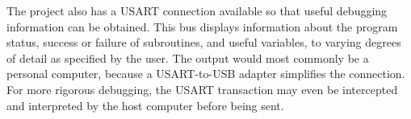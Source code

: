 The project also has a USART connection available so that useful debugging information can be obtained\DIFdelbegin {}\DIFdelend . This bus displays information about the program status, success or failure of subroutines, and useful variables, to varying degrees of detail as specified by the user. The output would most commonly be a personal computer, because a USART-to-USB adapter simplifies the connection. For more rigorous debugging, the USART transaction may even be intercepted and interpreted by the host computer before being sent.

